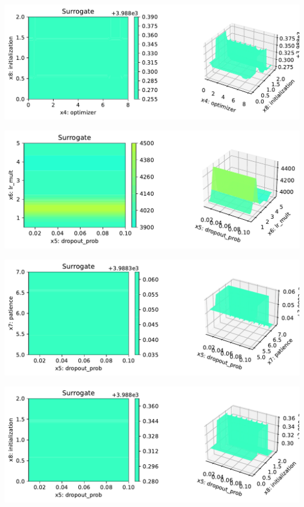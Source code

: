 \documentclass[
  letterpaper,
  DIV=11,
  numbers=noendperiod]{scrreprt}
\begin{document}
\includegraphics{031_spot_lightning_linear_diabetes_files/figure-pdf/cell-19-output-23.pdf}

\includegraphics{031_spot_lightning_linear_diabetes_files/figure-pdf/cell-19-output-24.pdf}

\includegraphics{031_spot_lightning_linear_diabetes_files/figure-pdf/cell-19-output-25.pdf}

\includegraphics{031_spot_lightning_linear_diabetes_files/figure-pdf/cell-19-output-26.pdf}
\end{document}
